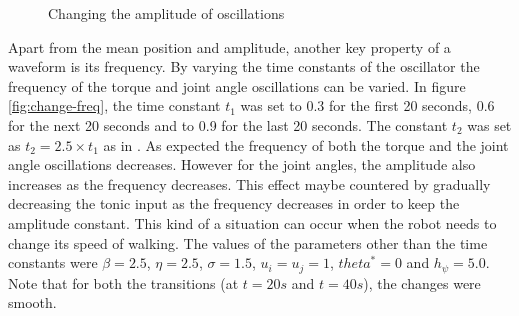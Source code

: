 \documentclass[12pt,twoside]{article}
\theoremstyle{plain}
\theoremstyle{definition}
\theoremstyle{remark}
\newcommand{\forceindent}{\leavevmode{\parindent=2em\indent}}
\begin{document}
\begin{figure}[htbp]
\centering     %
{}
\caption{Changing the amplitude of oscillations}
\label{fig:change-amp}
\end{figure}

\forceindent Apart from the mean position and amplitude, another key property of a waveform is its frequency. By varying the time constants of the oscillator the frequency of the torque and joint angle oscillations can be varied. In figure \ref{fig:change-freq}, the time constant $t_1$ was set to 0.3 for the first 20 seconds, 0.6 for the next 20 seconds and to 0.9 for the last 20 seconds. The constant $t_2$ was set as $t_2 = 2.5 \times t_1$ as in \cite{Ronsse2009}. As expected the frequency of both the torque and the joint angle oscillations decreases. However for the joint angles, the amplitude also increases as the frequency decreases. This effect maybe countered by gradually decreasing the tonic input as the frequency decreases in order to keep the amplitude constant. This kind of a situation can occur when the robot needs to change its speed of walking. The values of the parameters other than the time constants were $\beta=2.5$,  $\eta=2.5$, $\sigma=1.5$, $u_i=u_j=1$, $theta^*=0$ and $h_{\psi}=5.0$. Note that for both the  transitions (at $t=20s$ and $t=40s$), the changes were smooth. 
\end{document}
